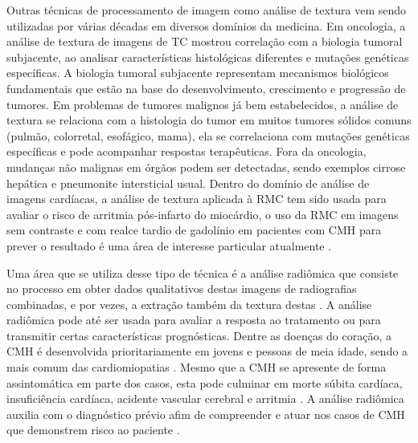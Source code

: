 Outras técnicas de processamento de imagem como análise de textura vem sendo utilizadas por várias décadas em diversos domínios da medicina. Em oncologia, a análise de textura de imagens de \gls{TC} mostrou correlação com a biologia tumoral subjacente, ao analisar características histológicas diferentes e mutações genéticas específicas. A biologia tumoral subjacente representam mecanismos biológicos fundamentais que estão na base do desenvolvimento, crescimento e progressão de tumores. Em problemas de tumores malignos já bem estabelecidos, a análise de textura se relaciona com a histologia do tumor em muitos tumores sólidos comuns (pulmão, colorretal, esofágico, mama), ela se correlaciona com mutações genéticas específicas e pode acompanhar respostas terapêuticas. Fora da oncologia, mudanças não malignas em órgãos podem ser detectadas, sendo exemplos cirrose hepática e pneumonite intersticial usual. Dentro do domínio de análise de imagens cardíacas, a análise de textura aplicada à \gls{RMC} tem sido usada para avaliar o risco de arritmia pós-infarto do miocárdio, o uso da RMC em imagens sem contraste e com realce tardio de gadolínio em pacientes com \gls{CMH} para prever o resultado é uma área de interesse particular atualmente \cite{schofieldTextureAnalysisCardiovascular2019a}.


Uma área que se utiliza desse tipo de técnica é a análise radiômica que consiste no processo em obter dados qualitativos destas imagens de radiografias combinadas, e por vezes, a extração também da textura destas \cite{lambinRadiomicsExtractingMore2012}. A análise radiômica pode até ser usada para avaliar a resposta ao tratamento ou para transmitir certas características prognósticas. Dentre as doenças do coração, a \gls{CMH} é desenvolvida prioritariamente em jovens e pessoas de meia idade, sendo a mais comum das cardiomiopatias . Mesmo que a \gls{CMH} se apresente de forma assintomática em parte dos casos, esta pode culminar em morte súbita cardíaca, insuficiência cardíaca, acidente vascular cerebral e arritmia . A análise radiômica auxilia com o diagnóstico prévio afim de compreender e atuar nos casos de \gls{CMH} que demonstrem risco ao paciente \cite{kwonComparisonMortalityCause2022}.



